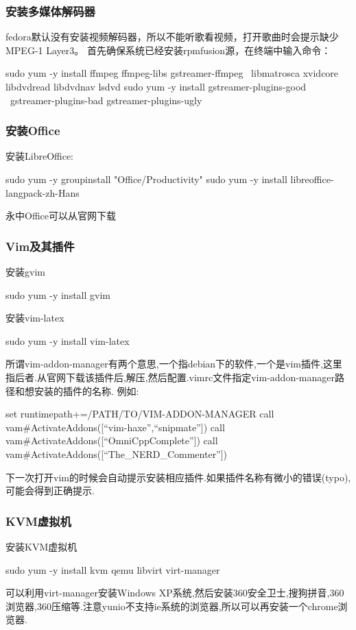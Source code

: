 \subsubsection{安装多媒体解码器}
fedora默认没有安装视频解码器，所以不能听歌看视频，打开歌曲时会提示缺少MPEG-1 Layer3。
首先确保系统已经安装rpmfusion源，在终端中输入命令：
\begin{shellcmd}
sudo yum -y install ffmpeg ffmpeg-libs gstreamer-ffmpeg \
libmatrosca xvidcore libdvdread libdvdnav lsdvd
sudo yum -y install gstreamer-plugins-good \ 
gstreamer-plugins-bad gstreamer-plugins-ugly
\end{shellcmd}

\subsubsection{安装Office}
安装LibreOffice:
\begin{shellcmd}
sudo yum -y groupinstall "Office/Productivity"
sudo yum -y install libreoffice-langpack-zh-Hans
\end{shellcmd}
永中Office可以从官网下载

\subsubsection{Vim及其插件}
安装gvim
\begin{shellcmd}
sudo yum -y install gvim
\end{shellcmd}
安装vim-latex
\begin{shellcmd}
sudo yum -y install vim-latex
\end{shellcmd}
所谓vim-addon-manager有两个意思,一个指debian下的软件,一个是vim插件,这里指后者.从官网下载该插件后,解压,然后配置.vimrc文件指定vim-addon-manager路径和想安装的插件的名称.
例如:
\begin{shellcmd}
set runtimepath+=/PATH/TO/VIM-ADDON-MANAGER
call vam#ActivateAddons([``vim-haxe'',``snipmate''])
call vam#ActivateAddons([``OmniCppComplete''])
call vam#ActivateAddons([``The_NERD_Commenter''])
\end{shellcmd}
下一次打开vim的时候会自动提示安装相应插件.如果插件名称有微小的错误(typo),可能会得到正确提示.

\subsubsection{KVM虚拟机}
安装KVM虚拟机
\begin{shellcmd}
sudo yum -y install kvm qemu libvirt virt-manager
\end{shellcmd}
可以利用virt-manager安装Windows XP系统,然后安装360安全卫士,搜狗拼音,360浏览器,360压缩等.注意yunio不支持ie系统的浏览器,所以可以再安装一个chrome浏览器.

